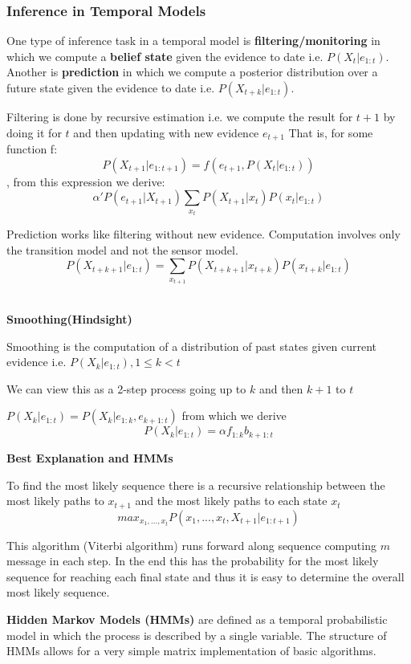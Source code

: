 \documentclass{article}
\begin{document}
\subsubsection{Inference in Temporal Models}

One type of inference task in a temporal model is \textbf{filtering/monitoring} in which we compute a \textbf{belief state} given the evidence to date i.e. $P(X_t | e_{1:t})$. 
Another is \textbf{prediction} in which we compute a posterior distribution over a future state given the evidence to date i.e. $P(X_{t+k} | e_{1:t})$. \newline

Filtering is done by recursive estimation i.e. we compute the result for $t+1$ by doing it for $t$ and then updating with new evidence $e_{t+1}$ That is, for some function f: $$P(X_{t+1} | e_{1:t+1}) = f(e_{t+1}, P(X_t | e_{1:t}))$$, from this expression we derive: $$\alpha' P(e_{t+1} | X_{t+1})\sum_{x_t} P(X_{t+1} | x_t) P(x_t | e_{1:t})$$

Prediction works like filtering without new evidence. Computation involves only the transition model and not the sensor model. $$P(X_{t+k+1} | e_{1:t}) = \sum_{x_{t+1}} P(X_{t+k+1} | x_{t+k})P(x_{t+k}|e_{1:t})$$ \

\textbf{Smoothing(Hindsight)}

Smoothing is the computation of a distribution of past states given current evidence i.e. $P(X_k | e_{1:t}), 1 \leq k < t$

We can view this as a 2-step process going up to $k$ and then $k+1$ to $t$ \newline

$P(X_k | e_{1:t}) = P(X_k | e_{1:k}, e_{k+1:t})$ from which we derive $$P(X_k | e_{1:t}) = \alpha f_{1:k}b_{k+1:t}$$

\textbf{Best Explanation and HMMs}

To find the most likely sequence there is a recursive relationship between the most likely paths to $x_{t+1}$ and the most likely paths to each state $x_t$ $$max_{x_1,...,x_t} P(x_1,...,x_t, X_{t+1} | e_{1:t+1})$$

This algorithm (Viterbi algorithm) runs forward along sequence computing $m$ message in each step. In the end this has the probability for the most likely sequence for reaching each final state and thus it is easy to determine the overall most likely sequence. 

\textbf{Hidden Markov Models (HMMs)} are defined as a temporal probabilistic model in which the process is described by a single variable. The structure of HMMs allows for a very simple matrix implementation of basic algorithms. 
\end{document}
